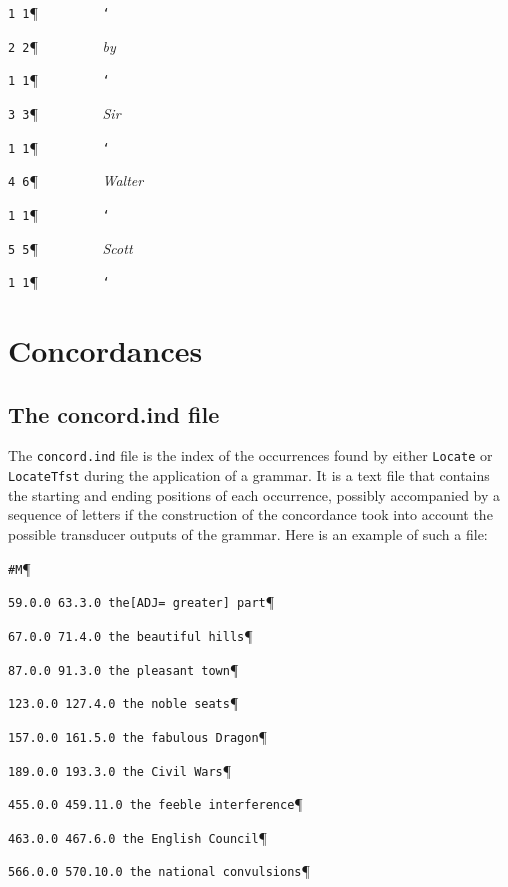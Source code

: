 \noindent \verb$1 1$\P \verb$         $\texttt{\char `\ }

\noindent \verb$2 2$\P \verb$         $\textit{by}

\noindent \verb$1 1$\P \verb$         $\texttt{\char `\ }

\noindent \verb$3 3$\P \verb$         $\textit{Sir}

\noindent \verb$1 1$\P \verb$         $\texttt{\char `\ }

\noindent \verb$4 6$\P \verb$         $\textit{Walter}

\noindent \verb$1 1$\P \verb$         $\texttt{\char `\ }

\noindent \verb$5 5$\P \verb$         $\textit{Scott}

\noindent \verb$1 1$\P \verb$         $\texttt{\char `\ }



\section{Concordances}
\subsection{The concord.ind file}
The \verb+concord.ind+ file is the index of the occurrences found by either
\verb+Locate+ or \verb+LocateTfst+ during the application of a grammar. It is a
text file that contains the starting and ending positions of each occurrence,
possibly accompanied by a sequence of letters if the construction of the concordance took
into account the possible transducer outputs of the grammar. 
Here is an example
of such a file:

\bigskip
\verb$#M$\P

\verb$59.0.0 63.3.0 the[ADJ= greater] part$\P

\verb$67.0.0 71.4.0 the beautiful hills$\P

\verb$87.0.0 91.3.0 the pleasant town$\P

\verb$123.0.0 127.4.0 the noble seats$\P

\verb$157.0.0 161.5.0 the fabulous Dragon$\P

\verb$189.0.0 193.3.0 the Civil Wars$\P

\verb$455.0.0 459.11.0 the feeble interference$\P

\verb$463.0.0 467.6.0 the English Council$\P

\verb$566.0.0 570.10.0 the national convulsions$\P

